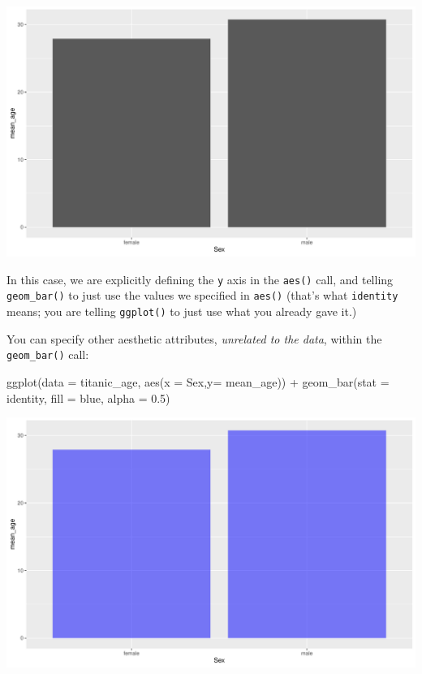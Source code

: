 \documentclass[
]{book}
\newenvironment{Shaded}{\begin{snugshade}}{\end{snugshade}}
\newcommand{\AttributeTok}[1]{\textcolor[rgb]{0.77,0.63,0.00}{#1}}
\newcommand{\FloatTok}[1]{\textcolor[rgb]{0.00,0.00,0.81}{#1}}
\newcommand{\FunctionTok}[1]{\textcolor[rgb]{0.00,0.00,0.00}{#1}}
\newcommand{\NormalTok}[1]{#1}
\newcommand{\SpecialCharTok}[1]{\textcolor[rgb]{0.00,0.00,0.00}{#1}}
\newcommand{\StringTok}[1]{\textcolor[rgb]{0.31,0.60,0.02}{#1}}
\begin{document}
\includegraphics{figures/unnamed-chunk-163-1.pdf}

In this case, we are explicitly defining the \texttt{y} axis in the \texttt{aes()} call, and telling \texttt{geom\_bar()} to just use the values we specified in \texttt{aes()} (that's what \texttt{\textquotesingle{}identity\textquotesingle{}} means; you are telling \texttt{ggplot()} to just use what you already gave it.)

You can specify other aesthetic attributes, \emph{unrelated to the data}, within the \texttt{geom\_bar()} call:

\begin{Shaded}
\begin{Highlighting}[]
\FunctionTok{ggplot}\NormalTok{(}\AttributeTok{data =}\NormalTok{ titanic\_age, }
       \FunctionTok{aes}\NormalTok{(}\AttributeTok{x =}\NormalTok{ Sex,}\AttributeTok{y=}\NormalTok{ mean\_age)) }\SpecialCharTok{+} 
  \FunctionTok{geom\_bar}\NormalTok{(}\AttributeTok{stat =} \StringTok{\textquotesingle{}identity\textquotesingle{}}\NormalTok{, }\AttributeTok{fill =} \StringTok{\textquotesingle{}blue\textquotesingle{}}\NormalTok{, }\AttributeTok{alpha =} \FloatTok{0.5}\NormalTok{) }
\end{Highlighting}
\end{Shaded}

\includegraphics{figures/unnamed-chunk-164-1.pdf}
\end{document}

